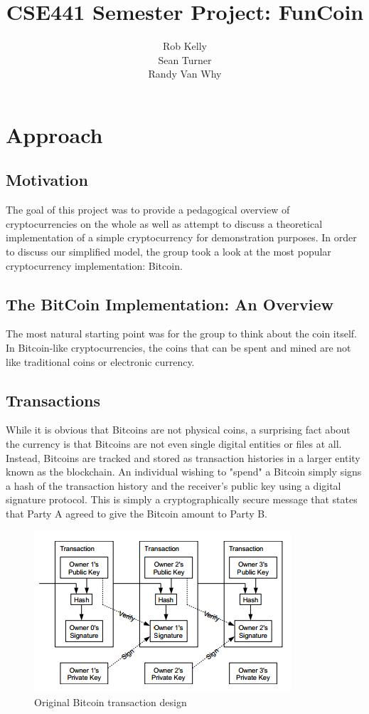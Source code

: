 \documentclass[12pt]{article}
\begin{document}
\title{CSE441 Semester Project: FunCoin}
\author{Rob Kelly\\Sean Turner\\Randy Van Why}
\maketitle


\section{Approach}
\subsection{Motivation}
The goal of this project was to provide a pedagogical overview of cryptocurrencies on the whole
as well as attempt to discuss a theoretical implementation of a simple cryptocurrency for
demonstration purposes. In order to discuss our simplified model, the group took a look at
the most popular cryptocurrency implementation: Bitcoin.

\subsection{The BitCoin Implementation: An Overview}
The most natural starting point was for the group to think about the coin itself.
In Bitcoin-like cryptocurrencies, the coins that can be spent and mined are not
like traditional coins or electronic currency.

\subsection{Transactions}
While it is obvious that Bitcoins are not physical coins, a surprising fact about
the currency is that Bitcoins are not even single digital entities or files at all.
Instead, Bitcoins are tracked and stored as transaction histories in a larger entity
known as the blockchain. An individual wishing to "spend" a Bitcoin simply signs
a hash of the transaction history and the receiver's public key using a digital signature
protocol. This is simply a cryptographically secure message that states that Party A agreed
to give the Bitcoin amount to Party B.

\begin{figure}[h!]
  \centering
  \includegraphics[scale=1]{transaction.png}
  \caption{Original Bitcoin transaction design \cite{nakamoto:bitcoin}}
\end{figure}
\end{document}
